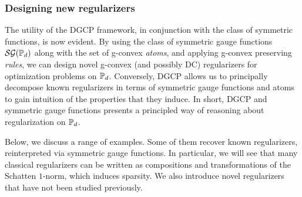 \documentclass[sn-nature]{sn-jnl}%
\theoremstyle{thmstyleone}%
\theoremstyle{thmstyletwo}%
\theoremstyle{thmstylethree}%
\begin{document}
\subsubsection{Designing new regularizers}
The utility of the DGCP framework, in conjunction with the class of symmetric functions, is now evident. By using the class of symmetric gauge functions $\mathcal{SG}(\mathbb{P}_d)$ along with the set of g-convex \textit{atoms}, and applying g-convex preserving \textit{rules}, we can design novel g-convex (and possibly DC) regularizers for optimization problems on $\mathbb{P}_d$. Conversely, DGCP allows us to principally decompose known regularizers in terms of symmetric gauge functions and atoms to gain intuition of the properties that they induce. In short, DGCP and symmetric gauge functions presents a principled way of reasoning about regularization on $\mathbb{P}_d$.

Below, we discuss a range of examples. Some of them recover known regularizers, reinterpreted via symmetric gauge functions. In particular, we will see that many classical regularizers can be written as compositions and transformations of the Schatten $1$-norm, which induces sparsity. We also introduce novel regularizers that have not been studied previously.










\end{document}
